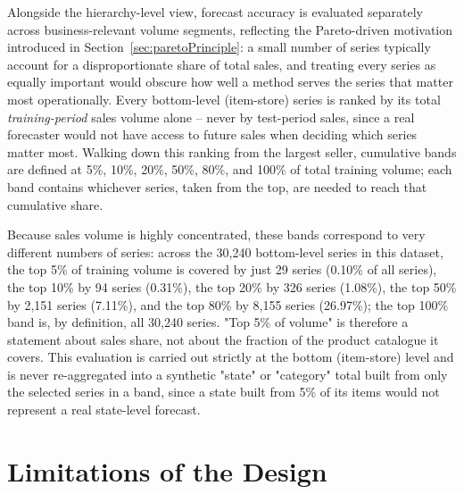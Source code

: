 Alongside the hierarchy-level view, forecast accuracy is evaluated separately across business-relevant volume segments, reflecting the Pareto-driven motivation introduced in Section~\ref{sec:paretoPrinciple}: a small number of series typically account for a disproportionate share of total sales, and treating every series as equally important would obscure how well a method serves the series that matter most operationally. Every bottom-level (item-store) series is ranked by its total \emph{training-period} sales volume alone -- never by test-period sales, since a real forecaster would not have access to future sales when deciding which series matter most. Walking down this ranking from the largest seller, cumulative bands are defined at 5\%, 10\%, 20\%, 50\%, 80\%, and 100\% of total training volume; each band contains whichever series, taken from the top, are needed to reach that cumulative share.

Because sales volume is highly concentrated, these bands correspond to very different numbers of series: across the 30,240 bottom-level series in this dataset, the top 5\% of training volume is covered by just 29 series (0.10\% of all series), the top 10\% by 94 series (0.31\%), the top 20\% by 326 series (1.08\%), the top 50\% by 2,151 series (7.11\%), and the top 80\% by 8,155 series (26.97\%); the top 100\% band is, by definition, all 30,240 series. "Top 5\% of volume" is therefore a statement about sales share, not about the fraction of the product catalogue it covers. This evaluation is carried out strictly at the bottom (item-store) level and is never re-aggregated into a synthetic "state" or "category" total built from only the selected series in a band, since a state built from 5\% of its items would not represent a real state-level forecast.

\section{Limitations of the Design}
\label{sec:designLimitations}

